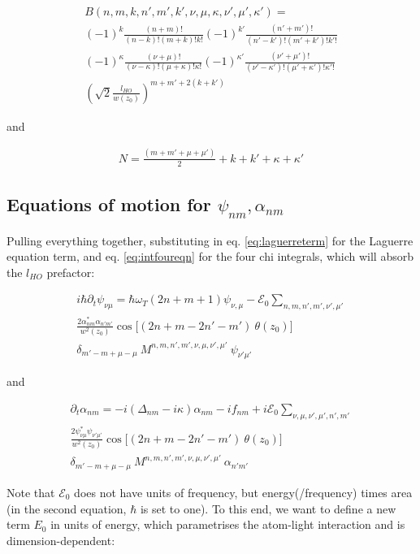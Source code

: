 \documentclass[a4paper,twocolumn,nobalancelastpage]{revtex4-1}
\newcommand{\lho}{l_{HO}}
\newcommand{\wzsq}{w^2(z_0)}
\newcommand{\lf}{\alpha_{nm}}
\newcommand{\lfp}{\alpha_{n'm'}}
\begin{document}
\begin{multline}
B(n,m,k,n',m',k',\nu, \mu,\kappa,\nu',\mu',\kappa') =  \\ 
(-1)^{k} \frac{(n+m)!}{(n-k)!(m+k)!k!}
(-1)^{k'} \frac{(n'+m')!}{(n'-k')!(m'+k')!k'!} \nonumber \\
(-1)^{\kappa} \frac{(\nu+\mu)!}{(\nu-\kappa)!(\mu+\kappa)!\kappa!}
(-1)^{\kappa'} \frac{(\nu'+\mu')!}{(\nu'-\kappa')!(\mu'+\kappa')!\kappa'!}
\\ \left(\sqrt{2}\frac{l_{HO}}{w(z_{0})}\right)^{m+m'+2(k+k')} 
\end{multline}

and

\begin{align}
N=\frac{(m+m'+\mu+\mu')}{2}+k+k'+\kappa+\kappa'
\end{align}

\subsection{Equations of motion for $\psi_{nm}, \alpha_{nm}$}

Pulling everything together, substituting in eq. \eqref{eq:laguerreterm} for the Laguerre equation term, and eq. \eqref{eq:intfoureqn} for the four chi integrals, which will absorb the $\lho$ prefactor:

\begin{multline}
i \hbar \partial_t \psi_{\nu \mu} = \hbar \omega_T (2n+m+1) \psi_{\nu, \mu}
- \mathcal{E}_0  \sum_{n,m,n',m', \nu', \mu'} \\ \frac{2 \lf^* \lfp}{ \wzsq} \nonumber  \cos \big[(2n+m-  2n'-m') \ \theta(z_0)\big] 
\\ \delta_{m'-m+\mu-\mu} \  M^{n,m,n',m',\nu,\mu,\nu',\mu'} \ \psi_{\nu'\mu'} 
\end{multline}

and

\begin{multline}
\partial_t \alpha_{nm}= -i(\Delta_{nm}-i\kappa) \alpha_{nm}-if_{nm} +i\mathcal{E}_0 \sum_{\nu, \mu,\nu', \mu',n',m'} \\ \frac{2 \psi_{\nu\mu}^* \psi_{\nu'\mu'}}{ w^2(z_0)} \cos \big[(2n+m-  2n'-m') \ \theta(z_0)\big] \\ \delta_{m'-m+\mu-\mu} \ 
M^{n,m,n',m',\nu,\mu,\nu',\mu'} \ \alpha_{n'm'} 
\end{multline}

Note that $\mathcal{E}_0$ does not have units of frequency, but energy(/frequency) times area (in the second equation, $\hbar$ is set to one).
To this end, we want to define a new term $E_0$ in units of energy, which parametrises the atom-light interaction and is dimension-dependent:
\end{document}
